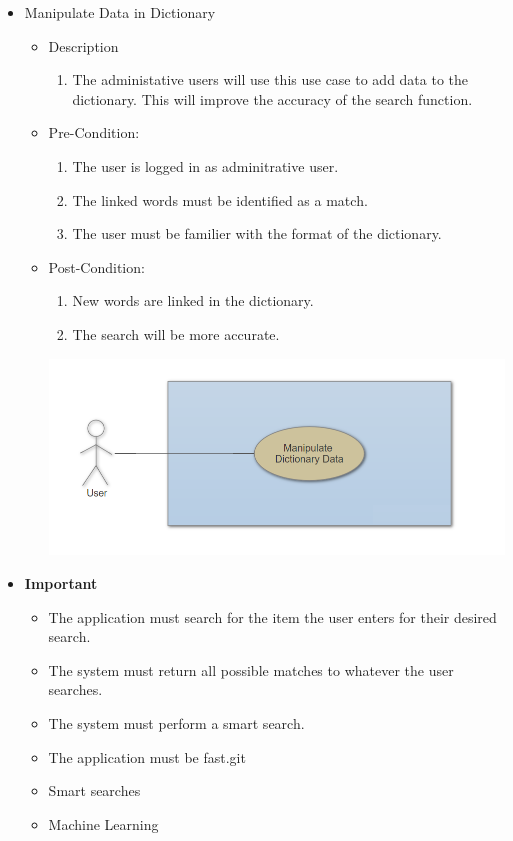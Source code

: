 \documentclass[a4paper,10pt]{article}
\begin{document}
\begin{enumerate}
\begin{itemize}
\begin{itemize}
			\end{itemize}
			\item Manipulate Data in Dictionary
			\begin{itemize}
				\item Description
					\begin{enumerate}
						\item The administative users will use this use case to add data to the dictionary. This will improve the accuracy of the search function.
					\end{enumerate}
				\item Pre-Condition:
					\begin{enumerate}	
						\item The user is logged in as adminitrative user.
						\item The linked words must be identified as a match.
						\item The user must be familier with the format of the dictionary.
					\end{enumerate}
				\item Post-Condition:
					\begin{enumerate}
						\item New words are linked in the dictionary.
						\item The search will be more accurate.
					\end{enumerate}
		 \includegraphics[scale=0.62]{Diagrams/ManipulateDictionaryUseCase.png}\\
		\end{itemize} 
		
		\item \textbf{Important} 
		\begin{itemize}
                \item The application must search for the item the user enters for their desired search. 
                \item The system must return all possible matches to whatever the user searches.
		\item The system must perform a smart search.
		\item The application must be fast.git 
		\item Smart searches
		\item Machine Learning
                \end{itemize}
		

\end{itemize}
\end{enumerate}
\end{document}
